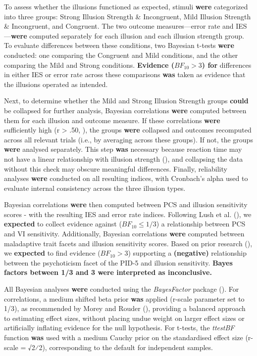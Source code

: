 \documentclass[
  man,
  floatsintext,
  longtable,
  nolmodern,
  notxfonts,
  notimes,
  colorlinks=true,linkcolor=blue,citecolor=blue,urlcolor=blue]{apa7}
\begin{document}
To assess whether the illusions functioned as expected, stimuli
\textbf{were} categorized into three groups: Strong Illusion Strength \&
Incongruent, Mild Illusion Strength \& Incongruent, and Congruent. The
two outcome measures---error rate and IES---\textbf{were} computed
separately for each illusion and each illusion strength group. To
evaluate differences between these conditions, two Bayesian t-tests
\textbf{were} conducted: one comparing the Congruent and Mild
conditions, and the other comparing the Mild and Strong conditions.
\textbf{Evidence (\(BF_{10} > 3\)) for} differences in either IES or
error rate across these comparisons \textbf{was} taken as evidence that
the illusions operated as intended.

Next, to determine whether the Mild and Strong Illusion Strength groups
\textbf{could} be collapsed for further analysis, Bayesian correlations
\textbf{were} computed between them for each illusion and outcome
measure. If these correlations \textbf{were} sufficiently high (r
\textgreater{} .50, ),
the groups \textbf{were} collapsed and outcomes recomputed across all
relevant trials (i.e., by averaging across these groups). If not, the
groups \textbf{were} analysed separately. This step \textbf{was}
necessary because reaction time may not have a linear relationship with
illusion strength (),
and collapsing the data without this check may obscure meaningful
differences. Finally, reliability analyses \textbf{were} conducted on
all resulting indices, with Cronbach's alpha used to evaluate internal
consistency across the three illusion types.

Bayesian correlations \textbf{were} then computed between PCS and
illusion sensitivity scores - with the resulting IES and error rate
indices. Following Lush et al. (), we
\textbf{expected} to collect evidence against (\(BF_{10} \leq 1/3\)) a
relationship between PCS and VI sensitivity. Additionally, Bayesian
correlations \textbf{were} computed between maladaptive trait facets and
illusion sensitivity scores. Based on prior research
(), we
\textbf{expected} to find evidence (\(BF_{10} > 3\)) supporting a
\textbf{(negative)} relationship between the psychoticism facet of the
PID-5 and illusion sensitivity. \textbf{Bayes factors between 1/3 and 3
were interpreted as inconclusive.}

All Bayesian analyses \textbf{were} conducted using the
\emph{BayesFactor} package (). For correlations, a medium shifted beta prior \textbf{was}
applied (r-scale parameter set to 1/3), as recommended by Morey and
Rouder (), providing a balanced
approach to estimating effect sizes, without placing undue weight on
larger effect sizes or artificially inflating evidence for the null
hypothesis. For t-tests, the \emph{ttestBF} function \textbf{was} used
with a medium Cauchy prior on the standardised effect size (r-scale =
√2⁄2), corresponding to the default for independent samples.
\end{document}
